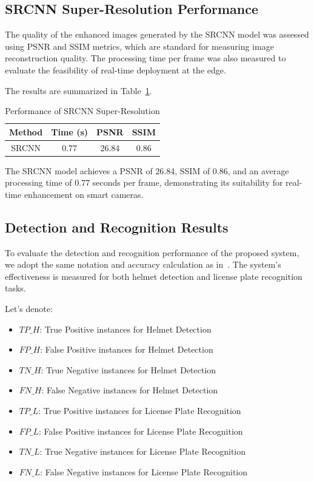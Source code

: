 \documentclass[conference]{IEEEtran}
\begin{document}
\subsection{SRCNN Super-Resolution Performance}

The quality of the enhanced images generated by the SRCNN model was assessed using PSNR and SSIM metrics, which are standard for measuring image reconstruction quality. The processing time per frame was also measured to evaluate the feasibility of real-time deployment at the edge.

The results are summarized in Table~\ref{tab:srcnn_results}.

\begin{table}[H]
\centering
\caption{Performance of SRCNN Super-Resolution}
\label{tab:srcnn_results}
\begin{tabular}{|c|c|c|c|}
\hline
\textbf{Method} & \textbf{Time (s)} & \textbf{PSNR} & \textbf{SSIM} \\
\hline
SRCNN & 0.77 & 26.84 & 0.86 \\
\hline
\end{tabular}
\end{table}

The SRCNN model achieves a PSNR of 26.84, SSIM of 0.86, and an average processing time of 0.77 seconds per frame, demonstrating its suitability for real-time enhancement on smart cameras.

\subsection{Detection and Recognition Results}

To evaluate the detection and recognition performance of the proposed system, we adopt the same notation and accuracy calculation as in~\cite{Nguyen2024}. The system's effectiveness is measured for both helmet detection and license plate recognition tasks.

Let’s denote:
\begin{itemize}
    \item $TP\_H$: True Positive instances for Helmet Detection
    \item $FP\_H$: False Positive instances for Helmet Detection
    \item $TN\_H$: True Negative instances for Helmet Detection
    \item $FN\_H$: False Negative instances for Helmet Detection
    \item $TP\_L$: True Positive instances for License Plate Recognition
    \item $FP\_L$: False Positive instances for License Plate Recognition
    \item $TN\_L$: True Negative instances for License Plate Recognition
    \item $FN\_L$: False Negative instances for License Plate Recognition
\end{itemize}
\end{document}
